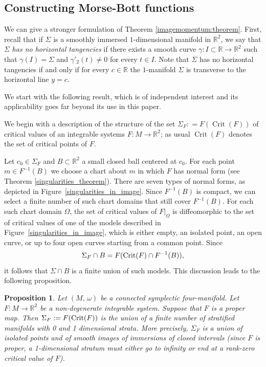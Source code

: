 \documentclass[11pt]{article}
\newtheorem{prop}[theorem]{Proposition}
\newcommand{\RM}{\mathbb{R}}
\begin{document}
\subsection{Constructing Morse-Bott functions}

We can give a stronger formulation of Theorem
\ref{imagemomentum:theorem}.  First, recall that if $\Sigma$ is a
smoothly immersed $1$-dimensional manifold in $\mathbb{R}^2$, we say
that $\Sigma$ \emph{has no horizontal tangencies} if there exists a
smooth curve $\gamma \colon I \subset \mathbb{R} \to \mathbb{R}^2$
such that $\gamma(I)=\Sigma$ and $\gamma'_2(t) \neq 0$ for every $t\in
I$. Note that $\Sigma$ has no horizontal tangencies if and only if for
every $c \in \mathbb{R}$ the $1$-manifold $\Sigma$ is transverse to
the horizontal line $y=c$.

We start with the following result, which is of independent interest
and its applicability goes far beyond its use in this paper.

We begin with a description of the structure of the set $\Sigma_F : =
F(\operatorname{Crit}(F))$ of critical values of an integrable systems
$F:M\to\mathbb{R}^2$; as usual $\operatorname{Crit}(F)$ denotes the
set of critical points of $F$.

Let $c_0\in\Sigma_F$ and $B\subset\RM^2$ a small closed ball centered
at $c_0$. For each point $m\in F^{-1}(B)$ we choose a chart about $m$
in which $F$ has normal form (see Theorem
\ref{singularities_theorem}). There are seven types of normal forms,
as depicted in Figure~\ref{singularities_in_image}. Since $F^{-1}(B)$
is compact, we can select a finite number of such chart domains that
still cover $F^{-1}(B)$. For each such chart domain $\Omega$, the set
of critical values of $F|_{\Omega}$ is diffeomorphic to the set of
critical values of one of the models described in
Figure~\ref{singularities_in_image}, which is either empty, an
isolated point, an open curve, or up to four open curves starting from
a common point. Since
$$
\Sigma_F\cap B=F(\textup{Crit}(F)\cap F^{-1}(B)),
$$ 
it follows that $\Sigma\cap B$ is a finite union of such models. This
discussion leads to the following proposition.

\begin{prop}
  \label{prop:strata}
  Let $(M,\, \omega)$ be a connected symplectic four-manifold.  Let
  $F:M\to\RM^2$ be a non-degenerate integrable system.  Suppose that
  $F$ is a proper map.  Then $\Sigma_F:=F(\textup{Crit}(F))$ is the
  union of a finite number of stratified manifolds with 0 and 1
  dimensional strata. More precisely, $\Sigma_F$ is a union of
  isolated points and of smooth images of immersions of closed
  intervals (since $F$ is proper, a 1-dimensional stratum must either
  go to infinity or end at a rank-zero critical value of $F$).
\end{prop}
\end{document}
